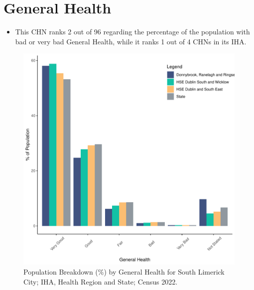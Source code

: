 \documentclass{article}
\begin{document}
\pagebreak

\section{General Health}\label{sect:GenHealth}
\begin{itemize}
\item  This CHN ranks  2 out of 96 regarding the percentage of the population with bad or very bad General Health, while it ranks   1 out of 4 CHNs in its IHA.
\end{itemize}
\begin{figure}[h]
	\centering
	\includegraphics[width = 150mm]{../figures/GenED.pdf}
	\caption{Population Breakdown (\%) by General Health for South Limerick City; IHA, Health Region and State;  Census 2022.}
	\label{fig:2ae19629-1a6a-13a3-e055-000000000001}
	\end{figure}
\end{document}
